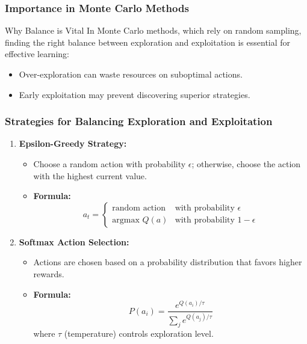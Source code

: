\documentclass[aspectratio=169]{beamer}
\begin{document}
\begin{frame}[fragile]
    \frametitle{Importance in Monte Carlo Methods}
    \begin{block}{Why Balance is Vital}
        In Monte Carlo methods, which rely on random sampling, finding the right balance between exploration and exploitation is essential for effective learning:
    \end{block}
    \begin{itemize}
        \item Over-exploration can waste resources on suboptimal actions.
        \item Early exploitation may prevent discovering superior strategies.
    \end{itemize}
\end{frame}

\begin{frame}[fragile]
    \frametitle{Strategies for Balancing Exploration and Exploitation}
    \begin{enumerate}
        \item \textbf{Epsilon-Greedy Strategy:}
            \begin{itemize}
                \item Choose a random action with probability $\epsilon$; otherwise, choose the action with the highest current value.
                \item \textbf{Formula:}
                \begin{equation}
                    a_t = 
                    \begin{cases}
                    \text{random action} & \text{with probability } \epsilon \\ 
                    \text{argmax } Q(a)   & \text{with probability } 1 - \epsilon 
                    \end{cases}
                \end{equation}
            \end{itemize}

        \item \textbf{Softmax Action Selection:}
            \begin{itemize}
                \item Actions are chosen based on a probability distribution that favors higher rewards.
                \item \textbf{Formula:}
                \begin{equation}
                    P(a_i) = \frac{e^{Q(a_i)/\tau}}{\sum_{j} e^{Q(a_j)/\tau}}
                \end{equation}
                where $\tau$ (temperature) controls exploration level.
            \end{itemize}


\end{enumerate}
\end{frame}
\end{document}
